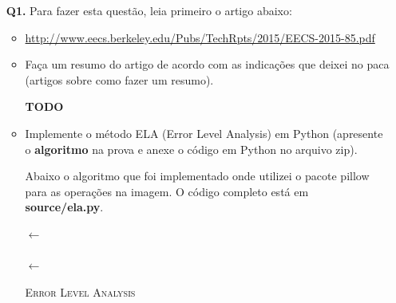 \documentclass[12pt]{article}
\begin{document}
\begin{itemize}
\item[{\bf Q1.}] Para fazer esta questão, leia primeiro o artigo abaixo:
\begin{itemize}
\item \url{http://www.eecs.berkeley.edu/Pubs/TechRpts/2015/EECS-2015-85.pdf}
\end{itemize} 
\begin{itemize}
\item Faça um resumo do artigo de acordo com as indicações que deixei no paca (artigos sobre como fazer um resumo).

\textbf{TODO}

\item Implemente o método ELA (Error Level Analysis) em Python (apresente o 
\textbf{algoritmo} na prova e anexe o código em Python no arquivo zip).

Abaixo o algoritmo que foi implementado onde utilizei o pacote pillow para as operações na imagem.
O código completo está em \textbf{source/ela.py}.

\begin{algorithm}[H]
    
    \SetAlgoLined
    \BlankLine
    \Img $\leftarrow$ \abrirImagem{\ImgPath}\\
    \BlankLine
    \\
    \ResavedImg $\leftarrow$ \abrirImagem{\ResavedPath}\\
    \BlankLine
    \BlankLine
    \Retorna{\ElaImg}
    \label{alg1}
    \caption{\textsc{Error Level Analysis}}
\end{algorithm}


\end{itemize}
\end{itemize}
\end{document}

